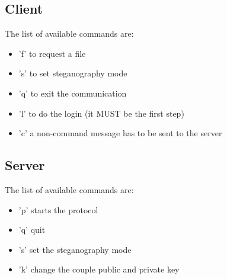 \subsection{Client}
The list of available commands are:
\begin{itemize}
	\item 'f' to request a file
	\item 's' to set steganography mode
	\item 'q' to exit the communication
	\item 'l' to do the login (it MUST be the first step)
	\item 'c' a non-command message has to be sent to the server
\end{itemize} 

\subsection{Server}
The list of available commands are:
\begin{itemize}
	\item 'p' starts the protocol
	\item 'q' quit
	\item 's' set the steganography mode
	\item 'k' change the couple public and private key
\end{itemize}

 
